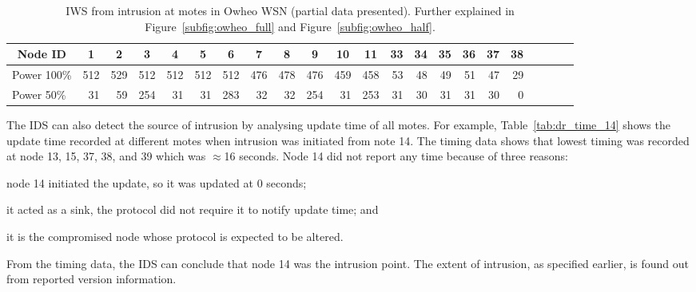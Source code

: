 \documentclass{CRPITStyle}
\newcommand*{\bd}[1]{\multicolumn{1}{|c|}{\bfseries #1}}
\begin{document}
\begin{table}[t!]
\centering
\begin{tabular}{|l|*{20}{r|}r|}
\hline
\bd{Node ID}           & \bd{1} & \bd{2} & \bd{3} & \bd{4} & \bd{5} & \bd{6} & \bd{7} & \bd{8} & \bd{9} & \bd{10} & \bd{11} &  \bd{33} & \bd{34} & \bd{35} & \bd{36} & \bd{37} & \bd{38} \\
\hline	%

Power 100\%	   & 512 & 529 & 512 & 512 & 512  & 512 & 476 & 478 & 476 & 459 & 458 & 53  & 48 & 49 & 51 & 47 & 29 \\

Power 50\%	  &31 & 59&254& 31& 31 &283& 32& 32& 254& 31 &253 &  31  & 30 & 31 & 31 & 30 & 0 \\
\hline
\end{tabular}
\caption{IWS from intrusion at motes in Owheo WSN (partial data presented). Further explained in Figure~\ref{subfig:owheo_full} and Figure~\ref{subfig:owheo_half}. }
\label{tab:owheo}
\end{table}


The IDS can also detect the source of intrusion by analysing update time of all motes. %
For example, Table~\ref{tab:dr_time_14} shows the update time recorded at different motes when intrusion was initiated from note 14.
The timing data shows that lowest timing was recorded at node 13, 15, 37, 38, and 39 which was $\approx$16 seconds.
Node 14 did not report any time because of three reasons: 
\begin{inparaenum}
\item node 14 initiated the update, so it was updated at $0$ seconds;
\item it acted as a sink, the protocol did not require it to notify update time; and 
\item it is the compromised node whose protocol is expected to be altered.
\end{inparaenum}
From the timing data, the IDS can conclude that node 14 was the intrusion point.
The extent of intrusion, as specified earlier, is found out from reported version information.
\end{document}
